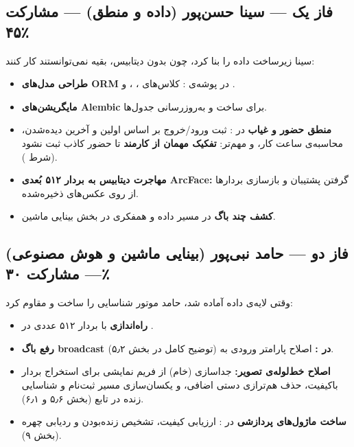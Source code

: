 \documentclass[12pt,a4paper]{article}
\begin{document}
\subsection{فاز یک — سینا حسن‌پور (داده و منطق) — مشارکت ۴۵٪}
سینا زیرساخت داده را بنا کرد، چون بدون دیتابیس، بقیه نمی‌توانستند کار کنند:
\begin{itemize}[rightmargin=0pt]
  \item \textbf{طراحی مدل‌های ORM} در پوشه‌ی : کلاس‌های ، ،  و .
  \item \textbf{مایگریشن‌های Alembic} برای ساخت و به‌روزرسانی جدول‌ها.
  \item \textbf{منطق حضور و غیاب} در : ثبت ورود/خروج بر اساس اولین و آخرین دیده‌شدن، محاسبه‌ی ساعت کار، و مهم‌تر: \textbf{تفکیک مهمان از کارمند} تا حضور کاذب ثبت نشود (شرط ).
  \item \textbf{مهاجرت دیتابیس به بردار ۵۱۲ بُعدی ArcFace:} گرفتن پشتیبان  و بازسازی بردارها از روی عکس‌های ذخیره‌شده.
  \item \textbf{کشف چند باگ} در مسیر داده و همفکری در بخش بینایی ماشین.
\end{itemize}

\subsection{فاز دو — حامد نبی‌پور (بینایی ماشین و هوش مصنوعی) — مشارکت ۳۰٪}
وقتی لایه‌ی داده آماده شد، حامد موتور شناسایی را ساخت و مقاوم کرد:
\begin{itemize}[rightmargin=0pt]
  \item \textbf{راه‌اندازی } با بردار ۵۱۲ عددی در .
  \item \textbf{رفع باگ broadcast در :} اصلاح پارامتر ورودی به  (توضیح کامل در بخش ۵٫۲).
  \item \textbf{اصلاح خط‌لوله‌ی تصویر:} جداسازی  (خام) از فریم نمایشی برای استخراج بردار باکیفیت، حذف هم‌ترازی دستی اضافی، و یکسان‌سازی مسیر ثبت‌نام و شناسایی زنده در تابع  (بخش ۵٫۶ و ۶٫۱).
  \item \textbf{ساخت ماژول‌های پردازشی} در : ارزیابی کیفیت، تشخیص زنده‌بودن و ردیابی چهره (بخش ۹).
\end{itemize}
\end{document}
